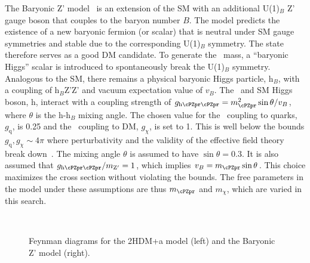 The Baryonic Z' model~\cite{PhysRevD.89.075017} is an extension of the SM with an additional U(1)$_{B}$ Z' gauge 
boson that couples to the baryon number $B$. The model predicts the existence of a new baryonic fermion (or scalar) that is neutral under SM gauge symmetries and stable due to the corresponding U(1)$_{B}$ symmetry. The state therefore serves as a good DM candidate.
To generate the  \cPZpr\ mass, a ``baryonic Higgs'' scalar is introduced to 
spontaneously break the U(1)$_B$ symmetry. Analogous to the SM, there remains 
a physical baryonic Higgs particle, h$_{B}$, with a coupling of h$_{B}$Z'Z' 
and vacuum expectation value of $v_{B}$. 
The \cPZpr\ and SM Higgs boson, h, interact with a coupling strength of 
$g_{\text{h}\cPZpr\cPZpr} = m_{\cPZpr}^{2} \sin \theta/v_{B}$, where $\theta$ is the h-h$_{B}$ 
mixing angle. The chosen value for the \cPZpr\ coupling to quarks,
$g_\text{q}$, is 0.25 and the \cPZpr\ coupling to DM, $g_\chi$, is set to 1. This is well below the bounds $g_\text{q},g_\chi\sim4\pi$ where perturbativity and the validity of the effective field theory break down~\cite{PhysRevD.89.075017}. The mixing angle $\theta$ is assumed to have $\sin\theta= 0.3$. It is also assumed that $g_{\text{h}\cPZpr\cPZpr}/m_{\mathrm{Z}'}=1$, which implies $v_B=m_{\cPZpr}\sin\theta$. This choice maximizes the cross section without violating the bounds. The free parameters in the model under these assumptions are thus $m_{\cPZpr}$ and $m_\chi$, which are varied in this search.

\begin{figure}
\centering
 \hspace{1cm}
  \\
\caption{Feynman diagrams for the 2HDM+a model (left) and the Baryonic Z' model (right).}
\label{feyns}
\end{figure}


